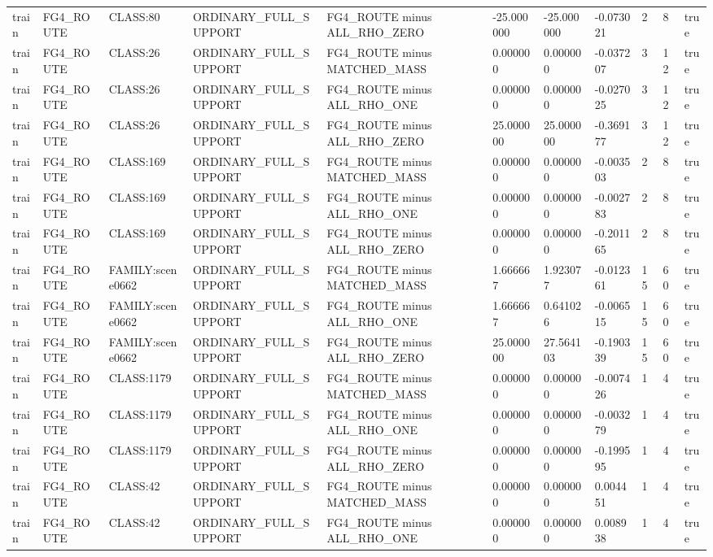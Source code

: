 \begin{tabular}{lllllllllll}
train & FG4\_ROUTE & CLASS:80 & ORDINARY\_FULL\_SUPPORT & FG4\_ROUTE minus ALL\_RHO\_ZERO & -25.000000 & -25.000000 & -0.073021 & 2 & 8 & true \\
train & FG4\_ROUTE & CLASS:26 & ORDINARY\_FULL\_SUPPORT & FG4\_ROUTE minus MATCHED\_MASS & 0.000000 & 0.000000 & -0.037207 & 3 & 12 & true \\
train & FG4\_ROUTE & CLASS:26 & ORDINARY\_FULL\_SUPPORT & FG4\_ROUTE minus ALL\_RHO\_ONE & 0.000000 & 0.000000 & -0.027025 & 3 & 12 & true \\
train & FG4\_ROUTE & CLASS:26 & ORDINARY\_FULL\_SUPPORT & FG4\_ROUTE minus ALL\_RHO\_ZERO & 25.000000 & 25.000000 & -0.369177 & 3 & 12 & true \\
train & FG4\_ROUTE & CLASS:169 & ORDINARY\_FULL\_SUPPORT & FG4\_ROUTE minus MATCHED\_MASS & 0.000000 & 0.000000 & -0.003503 & 2 & 8 & true \\
train & FG4\_ROUTE & CLASS:169 & ORDINARY\_FULL\_SUPPORT & FG4\_ROUTE minus ALL\_RHO\_ONE & 0.000000 & 0.000000 & -0.002783 & 2 & 8 & true \\
train & FG4\_ROUTE & CLASS:169 & ORDINARY\_FULL\_SUPPORT & FG4\_ROUTE minus ALL\_RHO\_ZERO & 0.000000 & 0.000000 & -0.201165 & 2 & 8 & true \\
train & FG4\_ROUTE & FAMILY:scene0662 & ORDINARY\_FULL\_SUPPORT & FG4\_ROUTE minus MATCHED\_MASS & 1.666667 & 1.923077 & -0.012361 & 15 & 60 & true \\
train & FG4\_ROUTE & FAMILY:scene0662 & ORDINARY\_FULL\_SUPPORT & FG4\_ROUTE minus ALL\_RHO\_ONE & 1.666667 & 0.641026 & -0.006515 & 15 & 60 & true \\
train & FG4\_ROUTE & FAMILY:scene0662 & ORDINARY\_FULL\_SUPPORT & FG4\_ROUTE minus ALL\_RHO\_ZERO & 25.000000 & 27.564103 & -0.190339 & 15 & 60 & true \\
train & FG4\_ROUTE & CLASS:1179 & ORDINARY\_FULL\_SUPPORT & FG4\_ROUTE minus MATCHED\_MASS & 0.000000 & 0.000000 & -0.007426 & 1 & 4 & true \\
train & FG4\_ROUTE & CLASS:1179 & ORDINARY\_FULL\_SUPPORT & FG4\_ROUTE minus ALL\_RHO\_ONE & 0.000000 & 0.000000 & -0.003279 & 1 & 4 & true \\
train & FG4\_ROUTE & CLASS:1179 & ORDINARY\_FULL\_SUPPORT & FG4\_ROUTE minus ALL\_RHO\_ZERO & 0.000000 & 0.000000 & -0.199595 & 1 & 4 & true \\
train & FG4\_ROUTE & CLASS:42 & ORDINARY\_FULL\_SUPPORT & FG4\_ROUTE minus MATCHED\_MASS & 0.000000 & 0.000000 & 0.004451 & 1 & 4 & true \\
train & FG4\_ROUTE & CLASS:42 & ORDINARY\_FULL\_SUPPORT & FG4\_ROUTE minus ALL\_RHO\_ONE & 0.000000 & 0.000000 & 0.008938 & 1 & 4 & true \\

\end{tabular}
